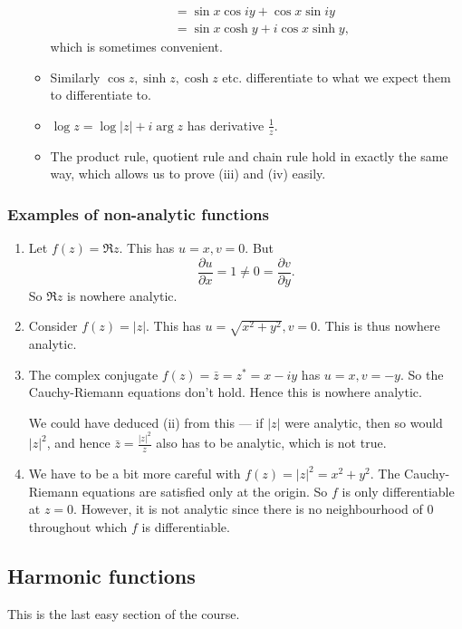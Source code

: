 \documentclass[a4paper]{article}
\begin{document}
\begin{eg}
\begin{enumerate}
\begin{itemize}
\begin{align*}
            &= \sin x \cos iy + \cos x \sin iy \\
            &= \sin x \cosh y + i \cos x \sinh y,
          \end{align*}
          which is sometimes convenient.
        \item Similarly $\cos z, \sinh z, \cosh z$ etc. differentiate to what we expect them to differentiate to.
        \item $\log z = \log|z| + i \arg z$ has derivative $\frac{1}{z}$.
        \item The product rule, quotient rule and chain rule hold in exactly the same way, which allows us to prove (iii) and (iv) easily.
      \end{itemize}
  \end{enumerate}
\end{eg}

\subsubsection*{Examples of non-analytic functions}
\begin{eg}\leavevmode
  \begin{enumerate}
    \item Let $f(z) = \Re z$. This has $u = x, v = 0$. But
      \[
        \frac{\partial u}{\partial x} = 1\not= 0 = \frac{\partial v}{\partial y}.
      \]
      So $\Re z$ is nowhere analytic.
    \item Consider $f(z) = |z|$. This has $u = \sqrt{x^2 + y^2}, v = 0$. This is thus nowhere analytic.
    \item The complex conjugate $f(z) = \bar z = z^* = x - iy$ has $u = x, v = -y$. So the Cauchy-Riemann equations don't hold. Hence this is nowhere analytic.

      We could have deduced (ii) from this --- if $|z|$ were analytic, then so would $|z|^2$, and hence $\bar{z} = \frac{|z|^2}{z}$ also has to be analytic, which is not true.
    \item We have to be a bit more careful with $f(z) = |z|^2 = x^2 + y^2$. The Cauchy-Riemann equations are satisfied only at the origin. So $f$ is only differentiable at $z = 0$. However, it is not analytic since there is no neighbourhood of $0$ throughout which $f$ is differentiable.
  \end{enumerate}
\end{eg}

\subsection{Harmonic functions}
This is the last easy section of the course.
\end{document}
